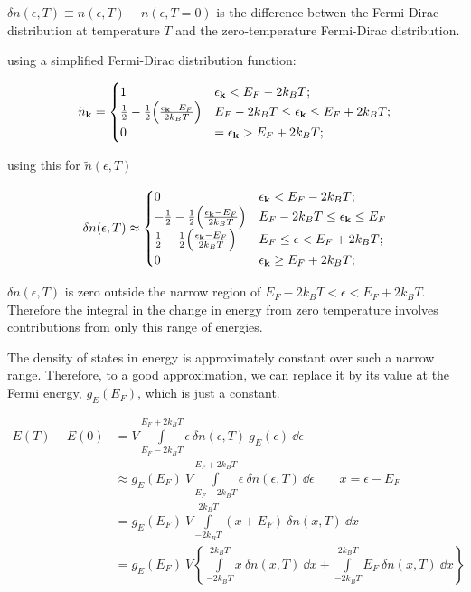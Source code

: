 \documentclass[10pt, a4paper, twocolumn]{article}
\begin{document}
$\delta n ( \epsilon , T)
\equiv n (\epsilon, T)- n (\epsilon , T = 0) $
is the difference betwen the Fermi-Dirac distribution at temperature $T$ and the zero-temperature Fermi-Dirac distribution.

using a simplified Fermi-Dirac distribution function:

\begin{equation*}
\tilde n _{\vb k} = 
\begin{cases}
1 & \epsilon _{\vb k} < E_F - 2 k_B T;
\\ \frac12 - \frac12
\qty( \frac{ \epsilon _{\vb k} - E_F}{2 k_B T}) 
& E_F - 2k_B T \leq \epsilon _{\vb k} \leq E_F
+ 2 k_B T;
\\ 0
& = \epsilon _{\vb k} > E_F + 2 k_B T;
\end{cases}
\end{equation*}

using this for $\tilde n (\epsilon, T)$

\begin{equation*}
\delta n (\epsilon , T) \approx
\begin{cases}
0 & \epsilon _{\vb k} < E_F - 2 k_B T;
\\ -\frac12 - \frac12
\qty( \frac{ \epsilon _{\vb k} - E_F}{2 k_B T}) 
& E_F - 2k_B T \leq \epsilon _{\vb k} \leq E_F
\\ \frac12 - \frac12
\qty( \frac{ \epsilon _{\vb k} - E_F}{2 k_B T}) 
& E_F \leq \epsilon < E_F + 2 k_B T;
\\ 0
& \epsilon _{\vb k} \geq E_F + 2 k_B T;
\end{cases}
\end{equation*}

$\delta n (\epsilon , T)$
is zero outside the narrow region of
$E_F - 2 k_B T < \epsilon < E_F + 2k_BT$.
Therefore the integral in the change in energy from zero temperature involves contributions from only this range of energies.

The density of states in energy is approximately constant over such a narrow range. Therefore, to a good approximation, we can replace it by its value at the Fermi energy, $g_E(E_F)$, which is just a constant.

\begin{equation*}
\begin{aligned}
E(T) - E(0) &=
V \int\limits_{E_F - 2 k_B T}^{E_F + 2k_BT}
\epsilon \ \delta n (\epsilon , T)
\ g_E (\epsilon) \ \dd \epsilon
\\ & \approx 
g_E (E_F)
\ V \int\limits_{E_F - 2 k_B T}^{E_F + 2k_BT}
\epsilon \ \delta n (\epsilon , T)
\ \dd \epsilon
\qquad x = \epsilon - E_F
\\ &= g_E (E_F) \ V
\int\limits_{-2k_BT}^{2k_BT}
(x + E_F) \ \delta n (x, T) \ \dd x
\\ &= g_E (E_F) \ V
\left\{
\int\limits_{-2k_BT}^{2k_BT}
x \ \delta n (x, T) \ \dd x
+ \int\limits_{-2k_BT}^{2k_BT}
E_F \ \delta n (x, T) \ \dd x
\right\}
\end{aligned}
\end{equation*}
\end{document}
